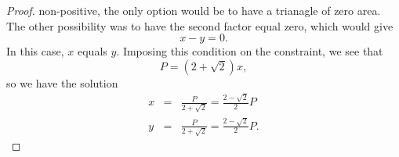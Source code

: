 \documentclass[12pt]{article}
\begin{document}
\begin{proof}
non-positive, the only option would be to have a trianagle of 
zero area.
The other possibility was to have the second factor equal zero,
which would give
\[
x - y = 0.
\]
In this case, $x$ equals $y$.  Imposing this condition on the constraint,
we see that
\[
P = (2 + \sqrt{2}) x,
\]
so we have the solution
\begin{eqnarray*}
x &=& \frac{P}{2 + \sqrt{2}} = \frac{2 - \sqrt{2}}{2} P \\
y &=& \frac{P}{2 + \sqrt{2}} = \frac{2 - \sqrt{2}}{2} P .
\end{eqnarray*}
\end{proof}
\end{document}
